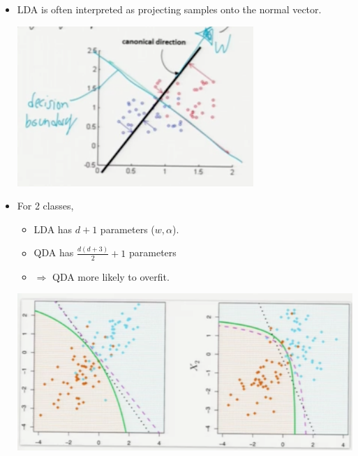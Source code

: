 \documentclass[10pt]{article}
\begin{document}
\begin{description}
\begin{itemize}
\begin{itemize}
						\item LDA is often interpreted as projecting samples onto the normal vector.
							\begin{center}
								\includegraphics[scale=0.5]{images/lda_projections}
							\end{center}
						\item For 2 classes,
							\begin{itemize}
								\item LDA has $d + 1$ parameters ($w, \alpha$).
								\item QDA has $\frac{d(d+3)}{2} + 1$ parameters
								\item $\Rightarrow$ QDA more likely to overfit.
							\end{itemize}
							\begin{center}
								\includegraphics[scale=0.5]{images/overfitting}
							\end{center}
					\end{itemize}
			\end{itemize}
\end{description}
\newpage
\end{document}
